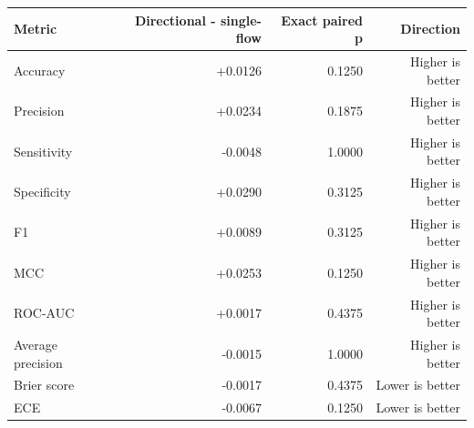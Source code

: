 \begin{tabular}{lrrr}
\toprule
Metric & Directional - single-flow & Exact paired p & Direction \\
\midrule
Accuracy & +0.0126 & 0.1250 & Higher is better \\
Precision & +0.0234 & 0.1875 & Higher is better \\
Sensitivity & -0.0048 & 1.0000 & Higher is better \\
Specificity & +0.0290 & 0.3125 & Higher is better \\
F1 & +0.0089 & 0.3125 & Higher is better \\
MCC & +0.0253 & 0.1250 & Higher is better \\
ROC-AUC & +0.0017 & 0.4375 & Higher is better \\
Average precision & -0.0015 & 1.0000 & Higher is better \\
Brier score & -0.0017 & 0.4375 & Lower is better \\
ECE & -0.0067 & 0.1250 & Lower is better \\
\bottomrule
\end{tabular}
